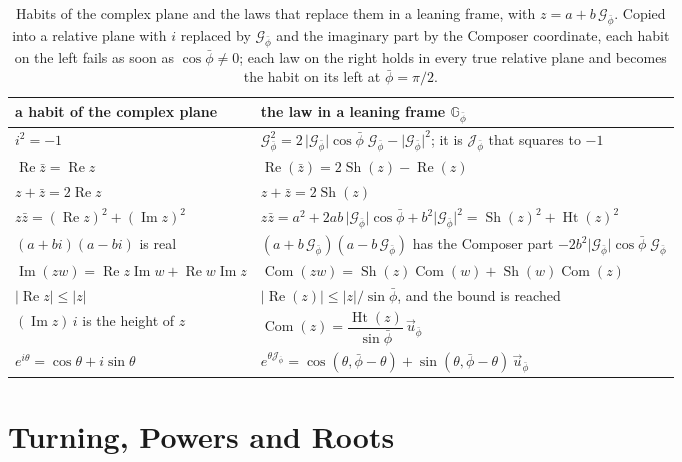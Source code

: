 \documentclass[11pt,a4paper]{amsart}
\theoremstyle{plain}
\theoremstyle{definition}
\theoremstyle{remark}
\newcommand{\pb}{\bar{\phi}}                     %
\newcommand{\Gp}{\mathcal{G}_{\bar{\phi}}}       %
\newcommand{\up}{\vec{u}_{\bar{\phi}}}           %
\newcommand{\Jp}{\mathcal{J}_{\bar{\phi}}}       %
\newcommand{\GNp}{\mathbb{G}_{\bar{\phi}}}       %
\renewcommand{\Re}{\operatorname{Re}}            %
\DeclareMathOperator{\Com}{Com}                  %
\DeclareMathOperator{\Sh}{Sh}                    %
\DeclareMathOperator{\Ht}{Ht}                    %
\begin{document}
\begin{table}[tb]
\centering
\small
\renewcommand{\arraystretch}{1.25}
\begin{tabular}{@{}l l@{}}
\toprule
\textbf{a habit of the complex plane} & \textbf{the law in a leaning frame $\GNp$} \\
\midrule
$i^2 = -1$ & $\Gp^2 = 2\,\lvert\Gp\rvert\cos\pb\;\Gp - \lvert\Gp\rvert^2$; it is $\Jp$ that squares to $-1$ \\
$\operatorname{Re}\bar{z} = \operatorname{Re} z$ & $\Re(\bar{z}) = 2\Sh(z) - \Re(z)$ \\
$z + \bar{z} = 2\operatorname{Re} z$ & $z + \bar{z} = 2\Sh(z)$ \\
$z\bar{z} = (\operatorname{Re} z)^2 + (\operatorname{Im} z)^2$ & $z\bar{z} = a^2 + 2ab\,\lvert\Gp\rvert\cos\pb + b^2\lvert\Gp\rvert^2 = \Sh(z)^2 + \Ht(z)^2$ \\
$(a + bi)(a - bi)$ is real & $(a + b\,\Gp)(a - b\,\Gp)$ has the Composer part $-2b^2\lvert\Gp\rvert\cos\pb\;\Gp$ \\
$\operatorname{Im}(zw) = \operatorname{Re} z\operatorname{Im} w + \operatorname{Re} w\operatorname{Im} z$ & $\Com(zw) = \Sh(z)\Com(w) + \Sh(w)\Com(z)$ \\
$\lvert\operatorname{Re} z\rvert \le \lvert z\rvert$ & $\lvert\Re(z)\rvert \le \lvert z\rvert/\sin\pb$, and the bound is reached \\
$(\operatorname{Im} z)\,i$ is the height of $z$ & $\Com(z) = \dfrac{\Ht(z)}{\sin\pb}\,\up$ \\[4pt]
$e^{i\theta} = \cos\theta + i\sin\theta$ & $e^{\theta\Jp} = \cos(\theta, \pb - \theta) + \sin(\theta, \pb - \theta)\,\up$ \\
\bottomrule
\end{tabular}
\caption{Habits of the complex plane and the laws that replace them in a leaning frame, with $z = a + b\,\Gp$. Copied into a relative plane with $i$ replaced by $\Gp$ and the imaginary part by the Composer coordinate, each habit on the left fails as soon as $\cos\pb \neq 0$; each law on the right holds in every true relative plane and becomes the habit on its left at $\pb = \pi/2$.}
\label{tab:habits}
\end{table}

\section{Turning, Powers and Roots}\label{sec:turning}
\end{document}
